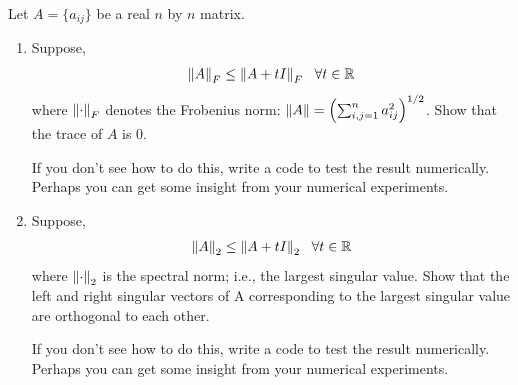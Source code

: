 \documentclass[10pt]{article}
\begin{document}
\begin{problem}
Let \( A = \{a_{ij}\} \) be a real \( n \) by \( n \) matrix.
\begin{enumerate}[label=(\alph*)]
    \item Suppose,
        \begin{align*}
            \left\lVert A\right\rVert_F \leq \left\lVert A+tI\right\rVert_F ~~ \forall t\in \mathbb{R}
        \end{align*}
        where \( \left\lVert\cdot\right\rVert_F \) denotes the Frobenius norm: \( \left\lVert A\right\rVert = \left( \sum_{i,j=1}^{n} a_{ij}^2 \right)^{1/2} \). Show that the trace of \( A \) is 0.
        
        If you don’t see how to do this, write a code to test the result numerically. Perhaps you can get some insight from your numerical experiments.
    \item  Suppose,
        \begin{align*}
            \left\lVert A\right\rVert_2 \leq \left\lVert A+tI\right\rVert_2 ~~ \forall t\in \mathbb{R}
        \end{align*}
        where \( \left\lVert\cdot\right\rVert_2 \) is the spectral norm; i.e., the largest singular value. Show that the left and right singular vectors of A corresponding to the largest singular value are orthogonal to each other. 
        
        If you don’t see how to do this, write a code to test the result numerically. Perhaps you can get some insight from your numerical experiments.
\end{enumerate}
\end{problem}
\end{document}

